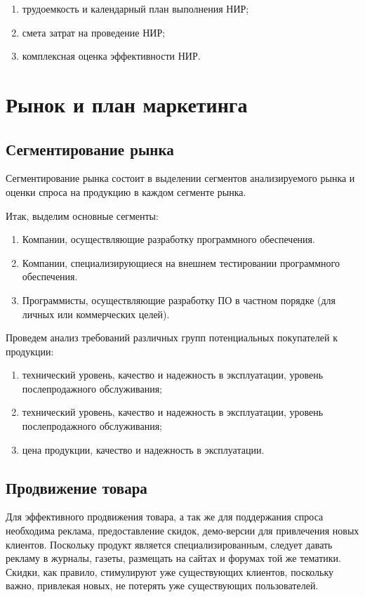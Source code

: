 \begin{enumerate}
\item трудоемкость и календарный план выполнения НИР;
\item смета затрат на проведение НИР;
\item комплексная оценка эффективности НИР.
\end{enumerate}

\section{Рынок и план маркетинга}

\subsection{Сегментирование рынка}

Сегментирование рынка состоит в выделении сегментов анализируемого рынка и оценки спроса
на продукцию в каждом сегменте рынка.

Итак, выделим основные сегменты:
\begin{enumerate}
\item Компании, осуществляющие разработку программного обеспечения.
\item Компании, специализирующиеся на внешнем тестировании программного обеспечения.
\item Программисты, осуществляющие разработку ПО в частном порядке (для личных или коммерческих целей).
\end{enumerate}

Проведем анализ требований различных групп потенциальных покупателей к продукции:
\begin{enumerate}
\item технический уровень, качество и надежность в эксплуатации, уровень послепродажного обслуживания;
\item технический уровень, качество и надежность в эксплуатации, уровень послепродажного обслуживания;
\item цена продукции, качество и надежность в эксплуатации.
\end{enumerate}

\subsection{Продвижение товара}
Для эффективного продвижения товара, а так же для поддержания спроса необходима реклама, предоставление скидок,
 демо-версии для привлечения новых клиентов. Поскольку продукт является специализированным, следует давать 
 рекламу в журналы, газеты, размещать на сайтах и форумах той же тематики. Скидки, как правило, стимулируют 
 уже существующих клиентов, поскольку важно, привлекая новых, не потерять уже существующих пользователей.

